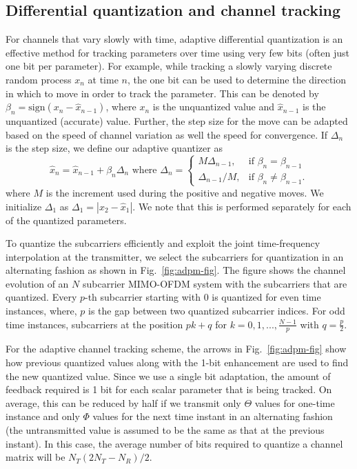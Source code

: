 \documentclass[journal,10pt,twocolumn]{IEEEtran}
\begin{document}
\subsection{Differential quantization and channel tracking}
\label{quantiz}
For channels that vary slowly with time, adaptive differential
quantization is an effective method for tracking parameters over time
using very few bits (often just one bit per parameter). For example,
while tracking a slowly varying discrete random process $x_n$ at time
$n$, the one bit can be used to determine the direction in which to
move in order to track the parameter. This can be denoted by
$\beta_{n} = \mbox{sign}(x_{n} - \hat{x}_{n-1})$, where $x_n$ is the
unquantized value and $\hat{x}_{n-1}$ is the unquantized (accurate)
value. Further, the step size for the move can be adapted based on the
speed of channel variation as well the speed for convergence. If
$\Delta_n$ is the step size, we define our adaptive quantizer as
\begin{equation}
\hat{x}_{n} = \hat{x}_{n-1} + \beta_{n}\Delta_{n} \mbox{ where }
\label{delta_eqn}
\Delta_{n} = \begin{cases}
    M \Delta_{n-1}, & \text{if $\beta_{n} = \beta_{n-1}$}\\
    \Delta_{n-1}/M , & \text{if $\beta_{n} \neq \beta_{n-1}$}.
  \end{cases}
\end{equation}
where $M$ is the increment used during the positive and negative
moves. We initialize $\Delta_1$ as $\Delta_1 = |x_{2}-\hat{x}_1|$. We
note that this is performed separately for each of the quantized
parameters.

To quantize the subcarriers efficiently and exploit the joint
time-frequency interpolation at the transmitter, we select the
subcarriers for quantization in an alternating fashion as shown in
Fig.~\ref{fig:adpm-fig}. The figure shows the channel evolution of an
$N$ subcarrier MIMO-OFDM system with the subcarriers that are
quantized. Every $p$-th subcarrier starting with $0$ is quantized for
even time instances, where, $p$ is the gap between two quantized
subcarrier indices. For odd time instances, subcarriers at the
position $pk+q$ for $k = 0,1,..., \frac{N-1}{p}$ with $q =
{\frac{p}{2}}$.

For the adaptive channel tracking scheme, the arrows in
Fig.~\ref{fig:adpm-fig} show how previous quantized values along with
the 1-bit enhancement are used to find the new quantized value. Since
we use a single bit adaptation, the amount of feedback required is 1
bit for each scalar parameter that is being tracked. On average, this
can be reduced by half if we transmit only $\Theta$ values for
one-time instance and only $\Phi$ values for the next time instant in
an alternating fashion (the untransmitted value is assumed to be the
same as that at the previous instant). In this case, the average
number of bits required to quantize a channel matrix will be
$N_{T}(2N_{T} - N_{R})/2$.
\end{document}
